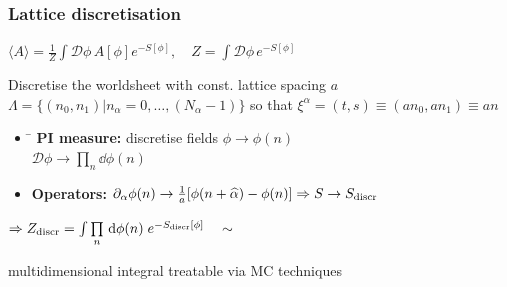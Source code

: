 \documentclass{beamer}
\newcommand{\del}{\partial}
\begin{document}
\begin{frame}
\frametitle{Lattice discretisation}
\begin{minipage}{0.65\linewidth}
\begin{tcolorbox}[colback=white!95!black, colframe=white!90!black]
{\small ${\!\!\!\!\!\!\!\langle A \rangle = \tfrac{1}{Z}\int \mathcal{D}\phi\, A[\phi]e^{-S[\phi]}, \quad Z=\int \mathcal{D}\phi\,e^{-S[\phi]}}$}
\end{tcolorbox}%
Discretise the worldsheet with const. lattice spacing $a$ \\
{\small$\mathit{\Lambda}=\lbrace(n_{0},n_{1})\vert n_{\alpha}=0,\ldots,(N_{\alpha}-1)\rbrace$} so that {\small$\xi^{\alpha}=(t,s)\equiv (an_{0},an_{1}) \equiv an$}
\end{minipage}
\begin{minipage}{0.3\linewidth}
\end{minipage}

%
\begin{itemize}
\item 
\begin{tabbing}
\hspace{3cm}\=\kill
 \textbf{PI measure:} \> discretise fields $\phi \to \phi(n)$ \\ 
   \> $\mathcal{D}\phi \to \prod\limits_{n} \dd \phi(n)$
\end{tabbing} 
\item \textbf{Operators: } $\del_{\alpha}\phi(n) \to \tfrac{1}{a}[\phi(n+\hat{\alpha})-\phi(n)] \Rightarrow S \to S_{\rm discr}$
\end{itemize}\hfill
\begin{minipage}{0.6\linewidth}
$\Rightarrow Z_{\rm discr} = \int \prod\limits_{n} \, \mathrm{d}\phi(n)\; e^{-S_{\rm discr}[\phi]}\quad\sim$
\end{minipage} 
\begin{minipage}{0.38\linewidth}
multidimensional integral treatable via MC techniques
\end{minipage}
\end{frame}
\end{document}
